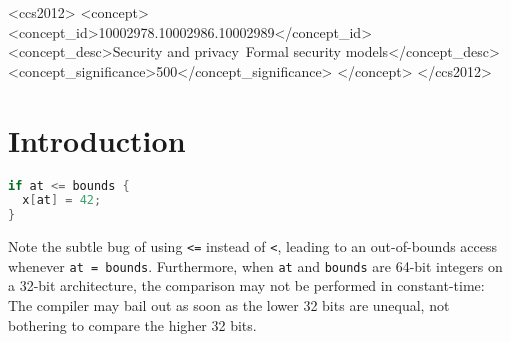\documentclass[acmsmall,review,screen]{acmart}
\begin{document}
\begin{CCSXML}
<ccs2012>
  <concept>
  <concept_id>10002978.10002986.10002989</concept_id>
  <concept_desc>Security and privacy~Formal security models</concept_desc>
  <concept_significance>500</concept_significance>
  </concept>
</ccs2012>
\end{CCSXML}




\maketitle

\section{Introduction}

\begin{lstlisting}[language=c,caption=``Wrong bounds check of two 64-bit integers.'']
if at <= bounds {
  x[at] = 42;
}
\end{lstlisting}
Note the subtle bug of using \verb|<=| instead of \verb|<|, leading to an out-of-bounds access whenever \verb|at = bounds|.
Furthermore, when \verb|at| and \verb|bounds| are 64-bit integers on a 32-bit architecture, the comparison may not be performed in constant-time: The compiler may bail out as soon as the lower 32 bits are unequal, not bothering to compare the higher 32 bits.
\end{document}
